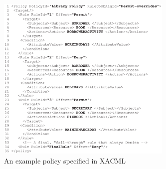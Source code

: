 \begin{figure}[t]
    \centering
        \includegraphics[width=3.3in]{example_policy.eps}
        \vspace{-5pt}
    \caption{\label{fig:example}An example policy specified in XACML}
    \vspace{-10pt}
\end{figure}
%
% 

